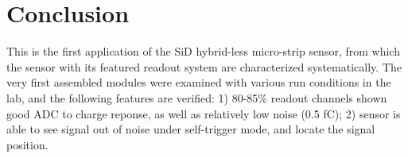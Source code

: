 \documentclass[conference]{IEEEtran}
\def\lycoris{\textsc{Lycoris }}%
\begin{document}
%




\section{Conclusion}

This is the first application of the SiD hybrid-less micro-strip sensor, from which the sensor with its featured readout system are characterized systematically.
The very first assembled modules were examined with various run conditions in the lab, and the following features are verified:
1) 80-85\% readout channels shown good ADC to charge reponse, as well as relatively low noise (0.5 fC);
2) sensor is able to see signal out of noise under self-trigger mode, and locate the signal position.
\end{document}
